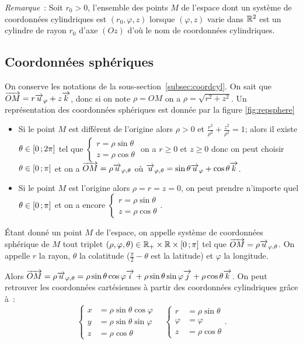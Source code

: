 \emph{Remarque}~: Soit \(r_0>0\), l'ensemble des points \(M\) de l'espace dont un système de coordonnées cylindriques est \((r_0,\varphi,z)\) lorsque \((\varphi,z)\) varie dans \(\mathbb{R}^2\) est un cylindre de rayon \(r_0\) d'axe \((Oz)\) d'où le nom de coordonnées cylindriques.


\subsection{Coordonnées sphériques}
On conserve les notations de la sous-section~\ref{subsec:coordcyl}. On sait que \(\overrightarrow{OM}=r\overrightarrow{u}_\varphi+z\overrightarrow{k}\), donc si on note \(\rho=OM\) on a \(\rho=\sqrt{r^2+z^2}\). Un représentation des coordonnées sphériques est donnée par la figure \ref{fig:repsphere}
\begin{itemize}
\item Si le point \(M\) est différent de l'origine alors \(\rho>0\) et \(\frac{r^2}{\rho^2}+\frac{z^2}{\rho^2}=1\); alors il existe \(\theta\in \left[ 0 \, ;  2\pi \right]\) tel que \(\begin{cases}r=\rho\sin\theta\\ z=\rho\cos\theta\end{cases}\) on a \(r\geqslant 0\) et \(z\geqslant 0\) donc on peut choisir \(\theta\in \left[ 0 \, ;  \pi \right]\) et on a \(\overrightarrow{OM}=\rho\overrightarrow{u}_{\varphi,\theta}\) où \(\overrightarrow{u}_{\varphi,\theta}=\sin\theta\overrightarrow{u}_\varphi+\cos\theta\overrightarrow{k}\).
\item Si le point \(M\) est l'origine alors \(\rho=r=z=0\), on peut prendre n'importe quel \(\theta \in \left[ 0 \, ;  \pi \right]\) et on a encore \(\begin{cases}r=\rho\sin\theta\\ z=\rho\cos\theta\end{cases}\).
\end{itemize}
\begin{defdef}
  Étant donné un point \(M\) de l'espace, on appelle système de coordonnées sphérique de \(M\) tout triplet \((\rho,\varphi,\theta)\in\mathbb{R}_{+} \times \mathbb{R} \times \left[ 0 \, ;  \pi \right]\) tel que \(\overrightarrow{OM}=\rho\overrightarrow{u}_{\varphi,\theta}\). On appelle \(r\) la rayon, \(\theta\) la colatitude (\(\frac{\pi}{2}-\theta\) est la latitude) et \(\varphi\) la longitude.
\end{defdef}
Alors \(\overrightarrow{OM}=\rho\overrightarrow{u}_{\varphi,\theta}=\rho\sin\theta\cos\varphi\overrightarrow{i}+\rho\sin\theta\sin\varphi\overrightarrow{j}+\rho\cos\theta\overrightarrow{k}\). On peut retrouver les coordonnées cartésiennes à partir des coordonnées cylindriques grâce à~:
\begin{equation}
  \begin{cases}
    x&=\rho\sin\theta\cos\varphi\\ y&=\rho\sin\theta\sin\varphi\\ z&=\rho\cos\theta
  \end{cases}
\quad
  \begin{cases}
    r&=\rho\sin\theta\\ \varphi&=\varphi\\ z&=\rho\cos\theta
  \end{cases}.
\end{equation}

